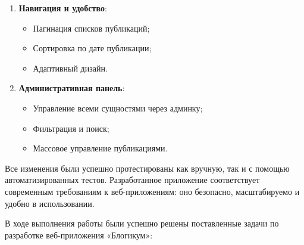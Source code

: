 \documentclass[pract,och,bachelor]{SCWorks}
\begin{document}
\begin{enumerate}
    \item \textbf{Навигация и удобство}:
    \begin{itemize}
        \item Пагинация списков публикаций;
        \item Сортировка по дате публикации;
        \item Адаптивный дизайн.
    \end{itemize}
    
    \item \textbf{Административная панель}:
    \begin{itemize}
        \item Управление всеми сущностями через админку;
        \item Фильтрация и поиск;
        \item Массовое управление публикациями.
    \end{itemize}
\end{enumerate}

Все изменения были успешно протестированы как вручную, так и с помощью автоматизированных тестов. Разработанное приложение соответствует современным требованиям к веб-приложениям: оно безопасно, масштабируемо и удобно в использовании.

\conclusion

В ходе выполнения работы были успешно решены поставленные задачи по разработке веб-приложения «Блогикум»:
\end{document}

